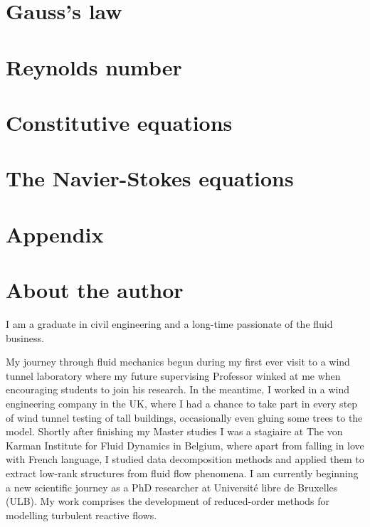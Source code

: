 \documentclass[10pt]{report}
\begin{document}


\chapter{Gauss's law}

\chapter{Reynolds number}



\chapter{Constitutive equations}



\chapter{The Navier-Stokes equations}



\chapter*{Appendix}

\newpage
\thispagestyle{empty}

\chapter*{About the author}

I am a graduate in civil engineering and a long-time passionate of the fluid business.

My journey through fluid mechanics begun during my first ever visit to a wind tunnel laboratory where my future supervising Professor winked at me when encouraging students to join his research. In the meantime, I worked in a wind engineering company in the UK, where I had a chance to take part in every step of wind tunnel testing of tall buildings, occasionally even gluing some trees to the model. Shortly after finishing my Master studies I was a stagiaire at The von Karman Institute for Fluid Dynamics in Belgium, where apart from falling in love with French language, I studied data decomposition methods and applied them to extract low-rank structures from fluid flow phenomena. I am currently beginning a new scientific journey as a PhD researcher at Université libre de Bruxelles (ULB). My work comprises the development of reduced-order methods for modelling turbulent reactive flows.
\end{document}
